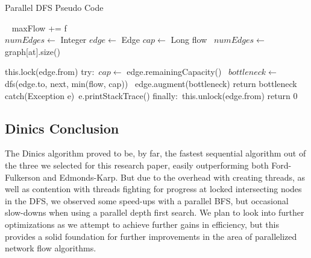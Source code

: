     \begin{algorithm} 
        \caption{Parallel DFS Pseudo Code}
        \label{alg:DParallel}
        \begin{algorithmic}[1]
            \
                    \State maxFlow += f\
                \EndFor        
            \EndFunction
            \\
                \State $numEdges \gets$ Integer
                \State $edge \gets$ Edge
                \State $cap \gets$ Long
                \If{at == t}
                    \State flow\
                \EndIf                
                \State $numEdges \gets$ graph[at].size()\
                
                        \State this.lock(edge.from)
                        \State try:\
                            \State $cap \gets$ edge.remainingCapacity()\
                                \State $bottleneck \gets$ dfs(edge.to, next, min(flow, cap))\
                                    \State edge.augment(bottleneck)
                                    \State return bottleneck
                                \EndIf
                            \EndIf    
                        \State catch(Exception e)\
                            \State e.printStackTrace()  
                        \State finally:\
                            \State this.unlock(edge.from)                            
                    \EndIf             
                \EndFor
                \State return 0
            \EndFunction              
        \end{algorithmic}
    \end{algorithm}     
    
\subsection{Dinics Conclusion}
    The Dinics algorithm proved to be, by far, the fastest sequential algorithm out of the three we selected for this research paper, easily outperforming both Ford-Fulkerson and Edmonds-Karp. But due to the overhead with creating threads, as well as contention with threads fighting for progress at locked intersecting nodes in the DFS, we observed some speed-ups with a parallel BFS, but occasional slow-downs when using a parallel depth first search. We plan to look into further optimizations as we attempt to achieve further gains in efficiency, but this provides a solid foundation for further improvements in the area of parallelized network flow algorithms.

